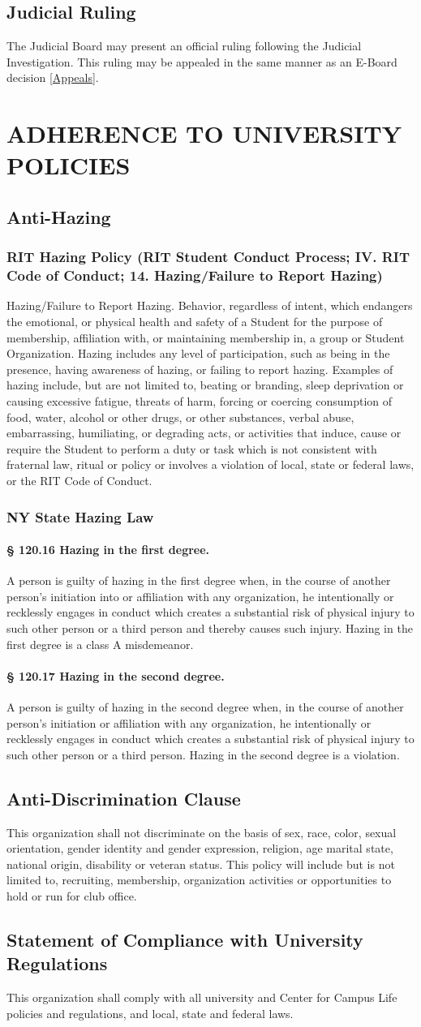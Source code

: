 \documentclass{article}
\newcommand{\article}[1]{\section{#1} \label{#1}}
\newcommand{\asection}[1]{\subsection{#1} \label{#1}}
\newcommand{\asubsection}[1]{\subsubsection{#1} \label{#1}}
\newcommand{\asubsubsection}[1]{\paragraph{#1} \label{#1}}
\begin{document}
\asection{Judicial Ruling}
The Judicial Board may present an official ruling following the Judicial Investigation.
This ruling may be appealed in the same manner as an E-Board decision \ref{Appeals}.

\article{ADHERENCE TO UNIVERSITY POLICIES}

\asection{Anti-Hazing}

\asubsection{RIT Hazing Policy (RIT Student Conduct Process; IV. RIT Code of Conduct; 14. Hazing/Failure to Report
Hazing)}
Hazing/Failure to Report Hazing.
Behavior, regardless of intent, which endangers the emotional, or physical health and safety of a Student for the purpose of membership, affiliation with, or maintaining membership in, a group or Student Organization. Hazing includes any level of participation, such as being in the presence, having awareness of hazing, or failing to report hazing.
Examples of hazing include, but are not limited to, beating or branding, sleep deprivation or causing excessive fatigue, threats of harm, forcing or coercing consumption of food, water, alcohol or other drugs, or other substances, verbal abuse, embarrassing, humiliating, or degrading acts, or activities that induce, cause or require the Student to perform a duty or task which is not consistent with fraternal law, ritual or policy or involves a violation of local, state or federal laws, or the RIT Code of Conduct.

\asubsection{NY State Hazing Law}

\asubsubsection{§ 120.16 Hazing in the first degree.}
A person is guilty of hazing in the first degree when, in the course of
another person's initiation into or affiliation with any organization, he intentionally or recklessly engages in
conduct which creates a substantial risk of physical injury to such other person or a third person and thereby
causes such injury. Hazing in the first degree is a class A misdemeanor.

\asubsubsection{§ 120.17 Hazing in the second degree.}
A person is guilty of hazing in the second degree when, in the course of another person's initiation or affiliation with any organization, he intentionally or recklessly engages in conduct which creates a substantial risk of physical injury to such other person or a third person.
Hazing in the second degree is a violation.

\asection{Anti-Discrimination Clause}
This organization shall not discriminate on the basis of sex, race, color, sexual orientation, gender identity and gender expression, religion, age marital state, national origin, disability or veteran status.
This policy will include but is not limited to, recruiting, membership, organization activities or opportunities to hold or run for club office.

\asection{Statement of Compliance with University Regulations}
This organization shall comply with all university and Center for Campus Life policies and regulations, and local, state and federal laws.
\end{document}
